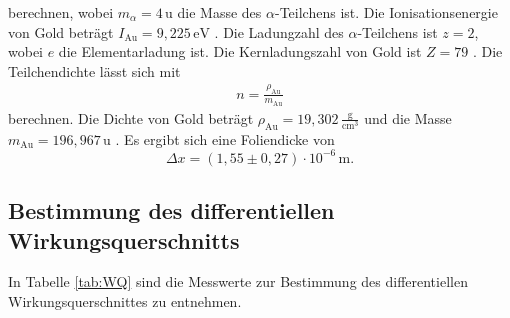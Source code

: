 berechnen, wobei $m_{\alpha} = 4\,\text{u}$ \cite{chem} die Masse des $\alpha$-Teilchens ist.
Die Ionisationsenergie von Gold beträgt $I_{\text{Au}} = 9,225\,\text{eV}$ \cite{PSE}.
Die Ladungzahl des $\alpha$-Teilchens ist $z = 2$, wobei $e$ die Elementarladung ist.
Die Kernladungszahl von Gold ist $Z = 79$ \cite{PSE}.
Die Teilchendichte lässt sich mit
\begin{align*}
  n = \frac{\rho_{\text{Au}}}{m_{\text{Au}}}
\end{align*}
berechnen.
Die Dichte von Gold beträgt $\rho_{\text{Au}} = 19,302\,\frac{\text{g}}{\text{cm}^3}$ \cite{PSE} und die Masse $m_{\text{Au}} = 196,967\,\text{u}$ \cite{PSE}.
Es ergibt sich eine Foliendicke von
\begin{equation*}
  \Delta{x} = (1,55\pm0,27)\cdot10^{-6}\,\text{m}.
\end{equation*}

\subsection{Bestimmung des differentiellen Wirkungsquerschnitts}
\label{kap:WQ}
In Tabelle \ref{tab:WQ} sind die Messwerte zur Bestimmung des differentiellen Wirkungsquerschnittes zu entnehmen.

